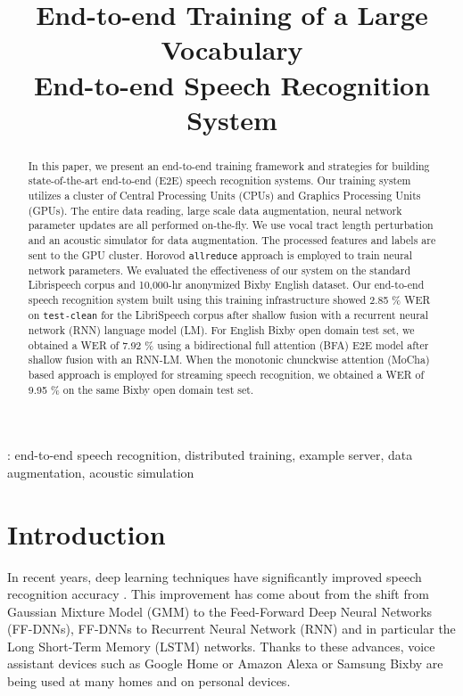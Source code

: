 \documentclass[a4paper]{article}
\title{End-to-end Training of a Large Vocabulary \\ End-to-end Speech Recognition System}
\begin{document}
\ninept
%
\maketitle
%
\begin{abstract}
In this paper, we present an end-to-end training framework and strategies for 
building state-of-the-art end-to-end (E2E) speech recognition systems.
Our training system utilizes a cluster of Central Processing Units 
  (CPUs) and Graphics Processing Units (GPUs).
The entire data reading, large scale data augmentation,
neural network parameter updates are all performed on-the-fly. 
  We use vocal tract length perturbation and an acoustic simulator 
for data augmentation. The processed features and labels are sent 
to the GPU cluster. Horovod {\tt allreduce} approach is employed to train
neural network parameters.
We evaluated the effectiveness of our system on the standard 
Librispeech corpus \cite{v_panayotov_icassp_2015_00} and 
  10,000-hr anonymized Bixby English dataset. 
Our end-to-end speech
recognition system built using this training infrastructure showed 
  2.85 \% WER on {\tt test-clean} for the LibriSpeech corpus 
 after shallow fusion with a recurrent neural network (RNN) language model (LM).
 For English Bixby open domain test set,
we obtained a WER of 7.92 \% using 
a bidirectional full attention (BFA) E2E model after shallow fusion with an RNN-LM.
When the monotonic chunckwise attention (MoCha) based approach is employed for 
streaming speech recognition, we obtained a WER of 9.95 \% 
  on the same Bixby open domain test set.
\end{abstract}
%
  : end-to-end speech recognition,
distributed training, example server, data augmentation, acoustic simulation
%
%
\section{Introduction}
In recent years, deep learning techniques have significantly 
improved speech recognition accuracy \cite{Seltzer2013DNNAurora4, 
Yu2013FeatureLearningDNN, V_Vanhoucke_Deep_Learning_NIPS_Workshop_2011,
G_Hinton_IEEE_Signal_Process_Mag_2012,
T_Sainath_IEEETran_2017_1, T_Sainath_Book_Chapter_2017_1}.
This improvement has come about from the shift from Gaussian Mixture Model
(GMM) to the Feed-Forward Deep Neural Networks (FF-DNNs), FF-DNNs
to Recurrent Neural Network (RNN) and in particular the Long Short-Term Memory
(LSTM) networks. 
Thanks to these advances, voice assistant devices such as Google Home
\cite{C_Kim_INTERSPEECH_2017_1, B_Li_INTERSPEECH_2017_1}
or Amazon Alexa or Samsung Bixby are being used at many homes and on personal devices. 
\end{document}
